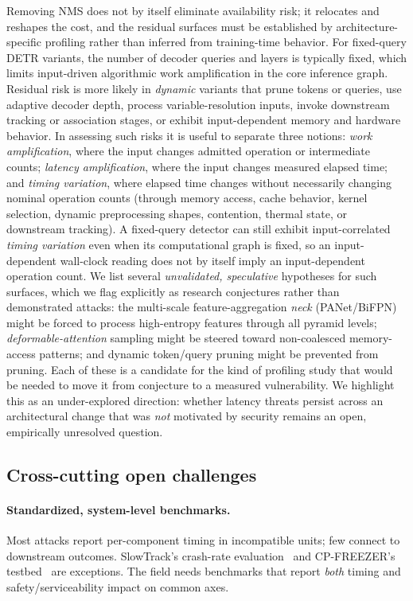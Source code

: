 \documentclass[acmsmall,screen,review,nonacm]{acmart}
\begin{document}
Removing NMS does not by itself eliminate availability risk; it relocates and reshapes the cost, and the residual surfaces must be established by architecture-specific profiling rather than inferred from training-time behavior. For fixed-query DETR variants, the number of decoder queries and layers is typically fixed, which limits input-driven algorithmic work amplification in the core inference graph. Residual risk is more likely in \emph{dynamic} variants that prune tokens or queries, use adaptive decoder depth, process variable-resolution inputs, invoke downstream tracking or association stages, or exhibit input-dependent memory and hardware behavior. In assessing such risks it is useful to separate three notions: \emph{work amplification}, where the input changes admitted operation or intermediate counts; \emph{latency amplification}, where the input changes measured elapsed time; and \emph{timing variation}, where elapsed time changes without necessarily changing nominal operation counts (through memory access, cache behavior, kernel selection, dynamic preprocessing shapes, contention, thermal state, or downstream tracking). A fixed-query detector can still exhibit input-correlated \emph{timing variation} even when its computational graph is fixed, so an input-dependent wall-clock reading does not by itself imply an input-dependent operation count. We list several \emph{unvalidated, speculative} hypotheses for such surfaces, which we flag explicitly as research conjectures rather than demonstrated attacks: the multi-scale feature-aggregation \emph{neck} (PANet/BiFPN) might be forced to process high-entropy features through all pyramid levels; \emph{deformable-attention} sampling might be steered toward non-coalesced memory-access patterns; and dynamic token/query pruning might be prevented from pruning. Each of these is a candidate for the kind of profiling study that would be needed to move it from conjecture to a measured vulnerability. We highlight this as an under-explored direction: whether latency threats persist across an architectural change that was \emph{not} motivated by security remains an open, empirically unresolved question.

\subsection{Cross-cutting open challenges}

\paragraph{Standardized, system-level benchmarks.} Most attacks report per-component timing in incompatible units; few connect to downstream outcomes. SlowTrack's crash-rate evaluation~\cite{ma2024slowtrack} and CP-FREEZER's testbed~\cite{wang2026cpfreezer} are exceptions. The field needs benchmarks that report \emph{both} timing and safety/serviceability impact on common axes.
\end{document}
